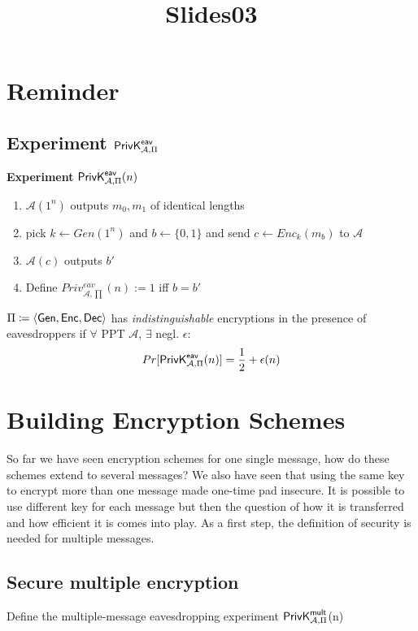 \documentclass[12pt]{article}
\title{Slides03}
\begin{document}
\maketitle
\tableofcontents
\newpage
\section{Reminder}
\subsection{ Experiment $\mathsf{PrivK}_{\mathcal{A},\Pi}^\mathsf{eav}$}
\textbf{Experiment} $\mathsf{PrivK}_{\mathcal{A},\Pi}^\mathsf{eav}(n)$
\begin{enumerate}
\item $\mathcal{A}(1^n)$ outputs $m_0,m_1$ of identical lengths
\item pick $k \leftarrow Gen(1^n)$ and  $b \leftarrow \{0,1\}$ and send $c \leftarrow Enc_k(m_b)$ to $\mathcal{A}$
 \item $\mathcal{A}(c)$ outputs $b'$
 \item Define $Priv_{\mathcal{A},\prod}^{eav}(n):=1$ iff $b=b'$
\end{enumerate}
$\Pi \coloneqq \langle \operatorname{\mathsf{Gen}}, \operatorname{\mathsf{Enc}}, \operatorname{\mathsf{Dec}} \rangle $ has \emph{indistinguishable} encryptions in the presence of eavesdroppers if $\forall$ PPT $\mathcal{A}$, $\exists$ negl. $\epsilon$:
\begin{equation*}
Pr[\mathsf{PrivK}_{\mathcal{A},\Pi}^\mathsf{eav}(n)] = \frac{1}{2} + \epsilon(n)
\end{equation*}

\section{Building Encryption Schemes}
So far we have seen encryption schemes for one single message, how do these schemes extend to several messages? We also have seen that using the same key to encrypt more than one message made one-time pad insecure. It is possible to use different key for each message but then the question of how it is transferred and how efficient it is comes into play. As a first step, the definition of security is needed for multiple messages.\\
\subsection{Secure multiple encryption}
Define the multiple-message eavesdropping experiment $\mathsf{PrivK}_{\mathcal{A},\Pi}^\mathsf{mult}$(n)
\end{document}
